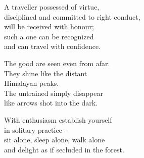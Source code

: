 A traveller possessed of virtue,\\
disciplined and committed to right conduct,\\
will be received with honour;\\
such a one can be recognized\\
and can travel with confidence.


The good are seen even from afar.\\
They shine like the distant\\
Himalayan peaks.\\
The untrained simply disappear\\
like arrows shot into the dark.


With enthusiasm establish yourself\\
in solitary practice --\\
sit alone, sleep alone, walk alone\\
and delight as if secluded in the forest.

